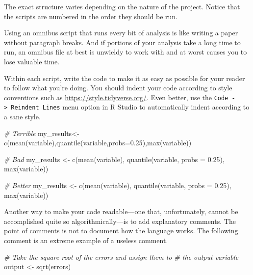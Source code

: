 \documentclass[
  12pt,
  oneside,openany]{book}
\newenvironment{Shaded}{\begin{snugshade}}{\end{snugshade}}
\newcommand{\AttributeTok}[1]{\textcolor[rgb]{0.77,0.63,0.00}{#1}}
\newcommand{\CommentTok}[1]{\textcolor[rgb]{0.56,0.35,0.01}{\textit{#1}}}
\newcommand{\FloatTok}[1]{\textcolor[rgb]{0.00,0.00,0.81}{#1}}
\newcommand{\FunctionTok}[1]{\textcolor[rgb]{0.00,0.00,0.00}{#1}}
\newcommand{\NormalTok}[1]{#1}
\newcommand{\OtherTok}[1]{\textcolor[rgb]{0.56,0.35,0.01}{#1}}
\begin{document}
The exact structure varies depending on the nature of the project. Notice that the scripts are numbered in the order they should be run.

Using an omnibus script that runs every bit of analysis is like writing a paper without paragraph breaks. And if portions of your analysis take a long time to run, an omnibus file at best is unwieldy to work with and at worst causes you to lose valuable time.

Within each script, write the code to make it as easy as possible for your reader to follow what you're doing. You should indent your code according to style conventions such as \url{https://style.tidyverse.org/}. Even better, use the \texttt{Code\ -\textgreater{}\ Reindent\ Lines} menu option in R Studio to automatically indent according to a sane style.

\begin{Shaded}
\begin{Highlighting}[]
\CommentTok{\# Terrible}
\NormalTok{my\_results}\OtherTok{\textless{}{-}}\FunctionTok{c}\NormalTok{(}\FunctionTok{mean}\NormalTok{(variable),}\FunctionTok{quantile}\NormalTok{(variable,}\AttributeTok{probs=}\FloatTok{0.25}\NormalTok{),}\FunctionTok{max}\NormalTok{(variable))}

\CommentTok{\# Bad}
\NormalTok{my\_results }\OtherTok{\textless{}{-}} \FunctionTok{c}\NormalTok{(}\FunctionTok{mean}\NormalTok{(variable),}
\FunctionTok{quantile}\NormalTok{(variable,}
\AttributeTok{probs =} \FloatTok{0.25}\NormalTok{),}
\FunctionTok{max}\NormalTok{(variable))}

\CommentTok{\# Better}
\NormalTok{my\_results }\OtherTok{\textless{}{-}} \FunctionTok{c}\NormalTok{(}\FunctionTok{mean}\NormalTok{(variable),}
                \FunctionTok{quantile}\NormalTok{(variable,}
                         \AttributeTok{probs =} \FloatTok{0.25}\NormalTok{),}
                \FunctionTok{max}\NormalTok{(variable))}
\end{Highlighting}
\end{Shaded}

Another way to make your code readable---one that, unfortunately, cannot be accomplished quite so algorithmically---is to add explanatory comments. The point of comments is not to document how the language works. The following comment is an extreme example of a useless comment.

\begin{Shaded}
\begin{Highlighting}[]
\CommentTok{\# Take the square root of the errors and assign them to}
\CommentTok{\# the output variable}
\NormalTok{output }\OtherTok{\textless{}{-}} \FunctionTok{sqrt}\NormalTok{(errors)}
\end{Highlighting}
\end{Shaded}
\end{document}
